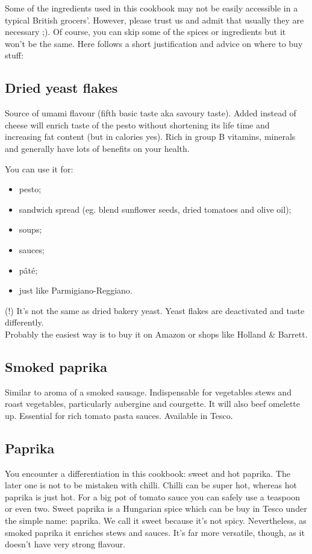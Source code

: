Some of the ingredients used in this cookbook may not be easily accessible in a typical British grocers'. However, please trust us and admit that usually they are necessary ;). Of course, you can skip some of the spices or ingredients but it won't be the same. Here follows a short justification and advice on where to buy stuff: 

\subsection*{Dried yeast flakes}

Source of umami flavour (fifth basic taste aka savoury taste). Added instead of cheese will enrich taste of the pesto without shortening its life time and increasing fat content (but in calories yes). Rich in group B vitamins, minerals and generally have lots of benefits on your health. 

You can use it for:

\begin{itemize}
    \setlength\itemsep{0.1mm}
    \item pesto;
    \item sandwich spread (eg. blend sunflower seeds, dried tomatoes and olive oil);
    \item soups;
    \item sauces; 
    \item pâté;
    \item just like Parmigiano-Reggiano.
\end{itemize}

(!) It's not the same as dried bakery yeast.
Yeast flakes are deactivated and taste differently.
\\
Probably the easiest way is to buy it on Amazon or shops like Holland \& Barrett.

\subsection* {Smoked paprika}
Similar to aroma of a smoked sausage.
Indispensable for vegetables stews and roast vegetables, particularly aubergine and courgette.
It will also beef omelette up. 
Essential for rich tomato pasta sauces.
Available in Tesco. 

\subsection*{Paprika}
You encounter a differentiation in this cookbook: sweet and hot paprika.
The later one is not to be mistaken with chilli.
Chilli can be super hot, whereas hot paprika is just hot.
For a big pot of tomato sauce you can safely use a teaspoon or even two.
Sweet paprika is a Hungarian spice which can be buy in Tesco under the simple name: paprika.
We call it sweet because it's not spicy.
Nevertheless, as smoked paprika it enriches stews and sauces.
It's far more versatile, though, as it doesn't have very strong flavour.

